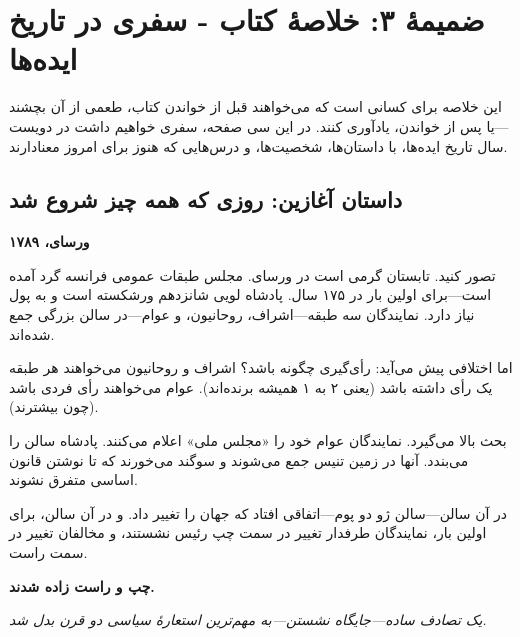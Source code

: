\chapter*{ضمیمهٔ ۳: خلاصهٔ کتاب - سفری در تاریخ ایده‌ها}

\begin{tcolorbox}[
    enhanced,
    colback=violet!10,
    colframe=violet,
    boxrule=3pt,
    arc=10pt,
    fonttitle=\bfseries\Large,
    title={\rl{به خواننده}}
]
\begin{center}
\large
این خلاصه برای کسانی است که می‌خواهند قبل از خواندن کتاب، طعمی از آن بچشند—یا پس از خواندن، یادآوری کنند. در این سی صفحه، سفری خواهیم داشت در دویست سال تاریخ ایده‌ها، با داستان‌ها، شخصیت‌ها، و درس‌هایی که هنوز برای امروز معنادارند.
\end{center}
\end{tcolorbox}

\vspace{10mm}

\section*{داستان آغازین: روزی که همه چیز شروع شد}


\textbf{ورسای، ۱۷۸۹}

تصور کنید. تابستان گرمی است در ورسای. مجلس طبقات عمومی فرانسه گرد آمده است—برای اولین بار در ۱۷۵ سال. پادشاه لویی شانزدهم ورشکسته است و به پول نیاز دارد. نمایندگان سه طبقه—اشراف، روحانیون، و عوام—در سالن بزرگی جمع شده‌اند.

اما اختلافی پیش می‌آید: رأی‌گیری چگونه باشد؟ اشراف و روحانیون می‌خواهند هر طبقه یک رأی داشته باشد (یعنی ۲ به ۱ همیشه برنده‌اند). عوام می‌خواهند رأی فردی باشد (چون بیشترند).

بحث بالا می‌گیرد. نمایندگان عوام خود را «مجلس ملی» اعلام می‌کنند. پادشاه سالن را می‌بندد. آنها در زمین تنیس جمع می‌شوند و سوگند می‌خورند که تا نوشتن قانون اساسی متفرق نشوند.

در آن سالن—سالن ژو دو پوم—اتفاقی افتاد که جهان را تغییر داد. و در آن سالن، برای اولین بار، نمایندگان طرفدار تغییر در سمت چپ رئیس نشستند، و مخالفان تغییر در سمت راست.

\textbf{چپ و راست زاده شدند.}


\begin{tcolorbox}[
    enhanced,
    colback=goldaccent!10,
    colframe=goldaccent,
    boxrule=1.5pt,
    arc=5pt
]
\begin{center}
\textit{یک تصادف ساده—جایگاه نشستن—به مهم‌ترین استعارهٔ سیاسی دو قرن بدل شد.}
\end{center}
\end{tcolorbox}

